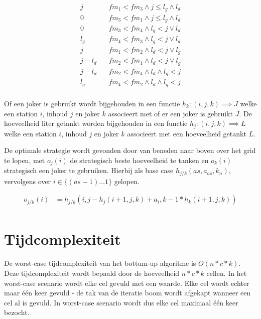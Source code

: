 \documentclass[10pt,tikz]{article}
\begin{document}
\begin{equation}
	\begin{aligned}
		j   \ \ \ \         & fm_{1} < fm_{3} \land j \leq l_g \land l_d \\
		0   \ \ \ \         & fm_{3} < fm_{1} \land j \leq l_g \land l_d \\
		0    \ \ \ \        & fm_{3} < fm_4 \land l_g < j \lor l_d       \\
		l_g    \ \ \ \      & fm_{4} < fm_3 \land l_g < j \lor l_d       \\
		j    \ \ \ \        & fm_1 < fm_2 \land l_d < j \lor l_g         \\
		j - l_d    \ \ \ \  & fm_2 < fm_1 \land l_d < j \lor l_g         \\
		j - l_d    \ \ \ \  & fm_2 < fm_4 \land l_d \land l_g < j        \\
		l_g    \ \ \ \      & fm_4 < fm_2 \land l_d \land l_g < j        \\
	\end{aligned}
	\label{eq:getankt}
\end{equation}

Of een joker is gebruikt wordt bijgehouden in een functie $h_k: (i,j,k) \implies J$ welke een station $i$, inhoud $j$ en joker $k$  associeert met of er een joker is gebruikt $J$.
De hoeveelheid liter getankt worden bijgehouden in een functie $h_j: (i,j,k) \implies L$ welke een station $i$, inhoud $j$ en joker $k$ associeert met een hoeveelheid getankt $L$.

De optimale strategie wordt gevonden door van beneden naar boven over het grid te lopen, met $o_j(i)$ de strategisch beste hoeveelheid te tanken en $o_k(i)$ strategisch een joker te gebruiken.
Hierbij als base case $h_{j/k}(as, a_{as}, k_n)$, vervolgens over $i \in \{(as - 1) \dots 1\}$ gelopen.

\begin{equation}
	\begin{aligned}
		o_{j/k}(i) & = h_{j/k}(i, j - h_j(i + 1, j, k) + a_i, k - 1 * h_k(i + 1, j, k)) \\
	\end{aligned}
	\label{eq:strategie}
\end{equation}

\section*{Tijdcomplexiteit}
De worst-case tijdcomplexiteit van het bottum-up algoritme is $O(n*c*k)$. 
Deze tijdcomplexiteit wordt bepaald door de hoeveelheid $n*c*k$ cellen.
In het worst-case scenario wordt elke cel gevuld met een waarde.
Elke cel wordt echter maar \'e\'en keer gevuld - de tak van de iteratie boom wordt afgekapt wanneer een cel al is gevuld.
In worst-case scenario wordt dus elke cel maximaal \'e\'en keer bezocht.
\end{document}
